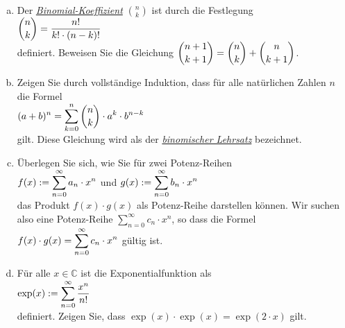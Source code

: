 \exercise
\begin{enumerate}[(a)]
\item Der \href{http://de.wikipedia.org/wiki/Binomialkoeffizient}{\emph{Binomial-Koeffizient}} $n \choose k$
      ist durch die Festlegung
      \\[0.2cm]
      \hspace*{1.3cm}
      $\displaystyle {n \choose k} = \frac{n!}{k! \cdot (n-k)!}$
      \\[0.2cm]
      definiert.  Beweisen Sie die Gleichung \quad
      $\displaystyle {n+1 \choose k+1} = {n \choose k} + {n \choose k+1}$.
\item Zeigen Sie durch vollst\"andige Induktion, dass f\"ur alle nat\"urlichen Zahlen $n$ die Formel
      \\[0.2cm]
      \hspace*{1.3cm}
      $\displaystyle (a + b)^n =\sum\limits_{k=0}^n {n \choose k} \cdot a^k \cdot b^{n-k}$
      \\[0.2cm]
      gilt.  Diese Gleichung wird als der 
      \href{http://de.wikipedia.org/wiki/Binomischer_Lehrsatz}{\emph{binomischer Lehrsatz}}
      bezeichnet.
\item \"Uberlegen Sie sich, wie Sie f\"ur zwei Potenz-Reihen 
      \\[0.2cm]
      \hspace*{1.3cm}
      $\displaystyle f(x) := \sum\limits_{n=0}^\infty a_n \cdot x^n$ \quad und \quad
      $\displaystyle g(x) := \sum\limits_{n=0}^\infty b_n \cdot x^n$ 
      \\[0.2cm]
      das Produkt $f(x) \cdot g(x)$ als Potenz-Reihe darstellen k\"onnen.  Wir suchen also eine
      Potenz-Reihe $\sum\limits_{n=0}^\infty c_n \cdot x^n$, so dass die Formel
      \\[0.2cm]
      \hspace*{1.3cm}
      $\displaystyle f(x) \cdot g(x) = \sum\limits_{n=0}^\infty c_n \cdot x^n$ \quad g\"ultig ist.
\item F\"ur alle $x \in \mathbb{C}$ ist die Exponentialfunktion als
      \\[0.2cm]
      \hspace*{1.3cm}
      $\displaystyle \exp(x) := \sum\limits_{n=0}^\infty \frac{x^n}{n!}$
      \\[0.2cm]
      definiert.  Zeigen Sie, dass $\exp(x) \cdot \exp(x) = \exp(2 \cdot x)$ gilt. \eox
\end{enumerate}

